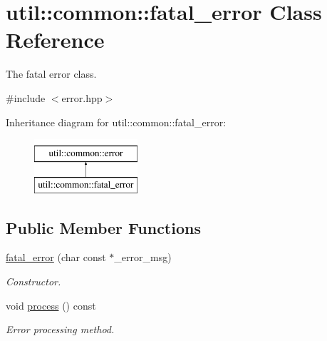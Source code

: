 \hypertarget{classutil_1_1common_1_1fatal__error}{\section{util\-:\-:common\-:\-:fatal\-\_\-error \-Class \-Reference}
\label{classutil_1_1common_1_1fatal__error}
}


\-The fatal error class.  




{\ttfamily \#include $<$error.\-hpp$>$}

\-Inheritance diagram for util\-:\-:common\-:\-:fatal\-\_\-error\-:\begin{figure}[H]
\begin{center}
\leavevmode
\includegraphics[height=2.000000cm]{classutil_1_1common_1_1fatal__error}
\end{center}
\end{figure}
\subsection*{\-Public \-Member \-Functions}
\begin{DoxyCompactItemize}
\item 
\hypertarget{classutil_1_1common_1_1fatal__error_a68d21d5c41478e255d0add5d20d98e13}{\hyperlink{classutil_1_1common_1_1fatal__error_a68d21d5c41478e255d0add5d20d98e13}{fatal\-\_\-error} (char const $\ast$\-\_\-error\-\_\-msg)}\label{classutil_1_1common_1_1fatal__error_a68d21d5c41478e255d0add5d20d98e13}

\begin{DoxyCompactList}\small\item\em \-Constructor. \end{DoxyCompactList}\item 
\hypertarget{classutil_1_1common_1_1fatal__error_a4066f565064ce91a317520586a2ff489}{void \hyperlink{classutil_1_1common_1_1fatal__error_a4066f565064ce91a317520586a2ff489}{process} () const }\label{classutil_1_1common_1_1fatal__error_a4066f565064ce91a317520586a2ff489}

\begin{DoxyCompactList}\small\item\em \-Error processing method. \end{DoxyCompactList}\end{DoxyCompactItemize}


